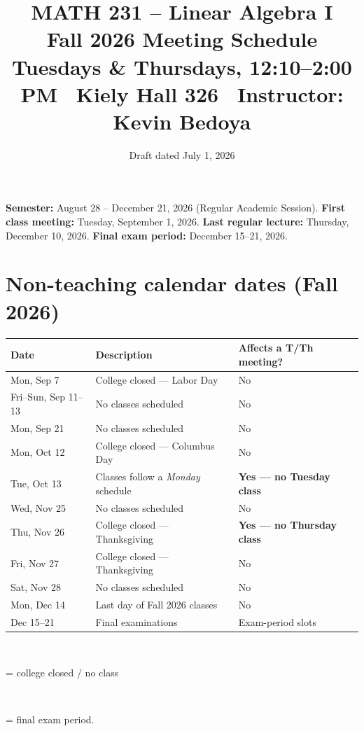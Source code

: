 \documentclass[11pt]{article}
\title{\vspace{-1.2cm}\textbf{\sffamily MATH 231 -- Linear Algebra I}\\[4pt]
       {\large\sffamily Fall 2026 Meeting Schedule}\\[2pt]
       {\normalsize\sffamily Tuesdays \& Thursdays, 12:10--2:00 PM \textbullet\ Kiely Hall 326
        \textbullet\ Instructor: Kevin Bedoya}}
\author{}
\date{\normalsize\sffamily Draft dated July 1, 2026}
\begin{document}
\maketitle
\vspace{-1.0cm}

\noindent\textbf{Semester:} August 28 -- December 21, 2026 (Regular Academic
Session). \textbf{First class meeting:} Tuesday, September 1, 2026.
\textbf{Last regular lecture:} Thursday, December 10, 2026.
\textbf{Final exam period:} December 15--21, 2026.

\section*{Non-teaching calendar dates (Fall 2026)}
\begin{center}
\renewcommand{\arraystretch}{1.15}
\begin{tabular}{@{}l l l@{}}
\toprule
\textbf{Date} & \textbf{Description} & \textbf{Affects a T/Th meeting?} \\
\midrule
Mon, Sep 7        & College closed --- Labor Day                & No \\
Fri--Sun, Sep 11--13 & No classes scheduled                     & No \\
Mon, Sep 21       & No classes scheduled                        & No \\
Mon, Oct 12       & College closed --- Columbus Day             & No \\
\rowcolor{RedOrange!18}
Tue, Oct 13       & Classes follow a \emph{Monday} schedule     & \textbf{Yes --- no Tuesday class} \\
Wed, Nov 25       & No classes scheduled                        & No \\
\rowcolor{RedOrange!18}
Thu, Nov 26       & College closed --- Thanksgiving             & \textbf{Yes --- no Thursday class} \\
Fri, Nov 27       & College closed --- Thanksgiving             & No \\
Sat, Nov 28       & No classes scheduled                        & No \\
Mon, Dec 14       & Last day of Fall 2026 classes               & No \\
Dec 15--21        & Final examinations                          & Exam-period slots \\
\bottomrule
\end{tabular}
\end{center}

\vspace{4pt}
\noindent\footnotesize
\colorbox{RedOrange!18}{\strut\ \ } = college closed / no class \quad
\colorbox{RoyalBlue!15}{\strut\ \ } = final exam period.
\normalsize
\end{document}

